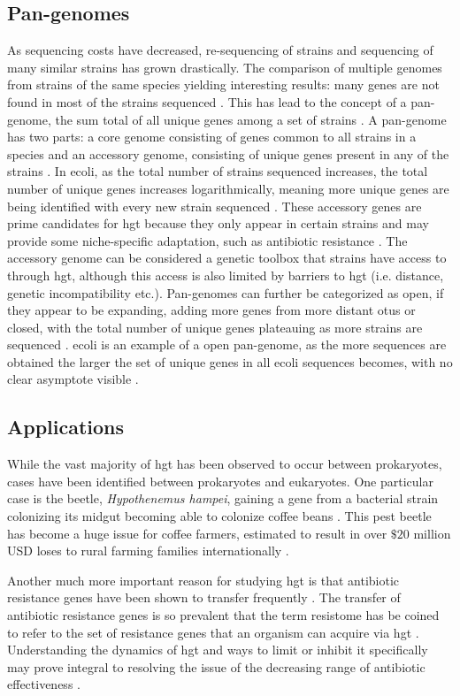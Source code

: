 \subsection*{Pan-genomes}
As sequencing costs have decreased, re-sequencing of strains and sequencing of many similar strains has grown drastically.
The comparison of multiple genomes from strains of the same species yielding interesting results: many genes are not found in most of the strains sequenced \citep{toolpan}.
This has lead to the concept of a pan-genome, the sum total of all unique genes among a set of strains \citep{pang}.
A pan-genome has two parts: a core genome consisting of genes common to all strains in a species and an accessory genome, consisting of unique genes present in any of the strains \citep{pang}.
In \ac{ecoli}, as the total number of strains sequenced increases, the total number of unique genes increases logarithmically, meaning more unique genes are being identified with every new strain sequenced \citep{ecopan}.
These accessory genes are prime candidates for \ac{hgt} because they only appear in certain strains and may provide some niche-specific adaptation, such as antibiotic resistance \citep{pang}.
The accessory genome can be considered a genetic toolbox that strains have access to through \ac{hgt}, although this access is also limited by barriers to \ac{hgt} (i.e. distance, genetic incompatibility etc.).
Pan-genomes can further be categorized as open, if they appear to be expanding, adding more genes from more distant \ac{otu}s or closed, with the total number of unique genes plateauing as more strains are sequenced \citep{pang}.
\ac{ecoli} is an example of a open pan-genome, as the more sequences are obtained the larger the set of unique genes in all \ac{ecoli} sequences becomes, with no clear asymptote visible \citep{pang}.
\subsection*{Applications}
While the vast majority of \ac{hgt} has been observed to occur between prokaryotes, cases have been identified between prokaryotes and eukaryotes.
One particular case is the beetle, \textit{Hypothenemus hampei}, gaining a gene from a bacterial strain colonizing its midgut becoming able to colonize coffee beans \citep{beetle}.
This pest beetle has become a huge issue for coffee farmers, estimated to result in over $\$20$ million USD loses to rural farming families internationally \citep{beetle}.\par
Another much more important reason for studying \ac{hgt} is that antibiotic resistance genes have been shown to transfer frequently \citep{amrhgt}.
The transfer of antibiotic resistance genes is so prevalent that the term resistome has be coined to refer to the set of resistance genes that an organism can acquire via \ac{hgt} \citep{amrhgt}.
Understanding the dynamics of \ac{hgt} and ways to limit or inhibit it specifically may prove integral to resolving the issue of the decreasing range of antibiotic effectiveness \citep{amrhgt}.
